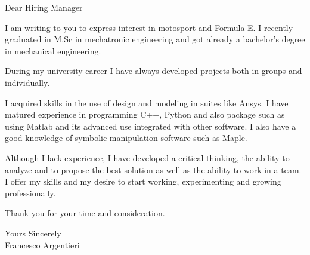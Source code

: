 \documentclass[a4paper,english]{friggeri-letter}
\begin{document}

\address{
   Circonvallazione Istoniense, 20 \\
   Vasto (CH), 66054 \\
   Italy
}




\opening{Dear Hiring Manager}

I am writing to you to express interest in motosport and Formula E.
I recently graduated in M.Sc in mechatronic engineering and got already a bachelor's degree in mechanical engineering.

During my university career I have always developed projects both in groups and individually.

I acquired skills in the use of design and modeling in suites like Ansys. I have matured experience in programming C++, Python and also package such as using Matlab and its advanced use integrated with other software.
I also have a good knowledge of symbolic manipulation software such as Maple. 

Although I lack experience, I have developed a critical thinking, the ability to analyze and to propose the best solution as well as the ability to work in a team. 
I offer my skills and my desire to start working, experimenting and growing professionally.

Thank you for your time and consideration.

\closing{
   Yours Sincerely\\
   Francesco Argentieri}
\end{document}
